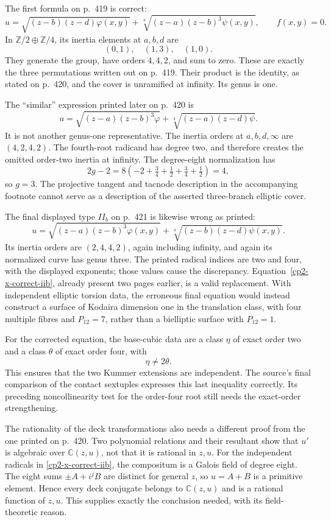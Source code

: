 The first formula on p.~419 is correct:
\begin{equation}
\label{cp2-x-correct-iib}
 u=\sqrt{(z-b)(z-d)\varphi(x,y)}
   +\sqrt[4]{(z-a)(z-b)^3\psi(x,y)},
 \qquad f(x,y)=0.
\end{equation}
In $\mathbb Z/2\oplus\mathbb Z/4$, its inertia elements at $a,b,d$ are
\[
 (0,1),\quad(1,3),\quad(1,0).
\]
They generate the group, have orders $4,4,2$, and sum to zero. These are exactly the three permutations written out on p.~419. Their product is the identity, as stated on p.~420, and the cover is unramified at infinity. Its genus is one.

The ``similar'' expression printed later on p.~420 is
\[
 u=\sqrt{(z-a)(z-b)^3\varphi}
   +\sqrt[4]{(z-a)(z-d)\psi}.
\]
It is not another genus-one representative. The inertia orders at $a,b,d,\infty$ are $(4,2,4,2)$. The fourth-root radicand has degree two, and therefore creates the omitted order-two inertia at infinity. The degree-eight normalization has
\[
 2g-2=8\left(-2+\tfrac34+\tfrac12+\tfrac34+\tfrac12\right)=4,
\]
so $g=3$. The projective tangent and tacnode description in the accompanying footnote cannot serve as a description of the asserted three-branch elliptic cover.

The final displayed type $II_b$ on p.~421 is likewise wrong as printed:
\[
 u=\sqrt{(z-a)(z-b)^3\varphi(x,y)}
   +\sqrt[4]{(z-b)(z-d)\psi(x,y)}.
\]
Its inertia orders are $(2,4,4,2)$, again including infinity, and again its normalized curve has genus three. The printed radical indices are two and four, with the displayed exponents; those values cause the discrepancy. Equation~\eqref{cp2-x-correct-iib}, already present two pages earlier, is a valid replacement. With independent elliptic torsion data, the erroneous final equation would instead construct a surface of Kodaira dimension one in the translation class, with four multiple fibres and $P_{12}=7$, rather than a bielliptic surface with $P_{12}=1$.

For the corrected equation, the base-cubic data are a class $\eta$ of exact order two and a class $\theta$ of exact order four, with
\[
 \eta\ne2\theta.
\]
This ensures that the two Kummer extensions are independent. The source's final comparison of the contact sextuples expresses this last inequality correctly. Its preceding noncollinearity test for the order-four root still needs the exact-order strengthening.

The rationality of the deck transformations also needs a different proof from the one printed on p.~420. Two polynomial relations and their resultant show that $u'$ is algebraic over $\mathbb C(z,u)$, not that it is rational in $z,u$. For the independent radicals in \eqref{cp2-x-correct-iib}, the compositum is a Galois field of degree eight. The eight sums $\pm A+i^jB$ are distinct for general $z$, so $u=A+B$ is a primitive element. Hence every deck conjugate belongs to $\mathbb C(z,u)$ and is a rational function of $z,u$. This supplies exactly the conclusion needed, with its field-theoretic reason.

